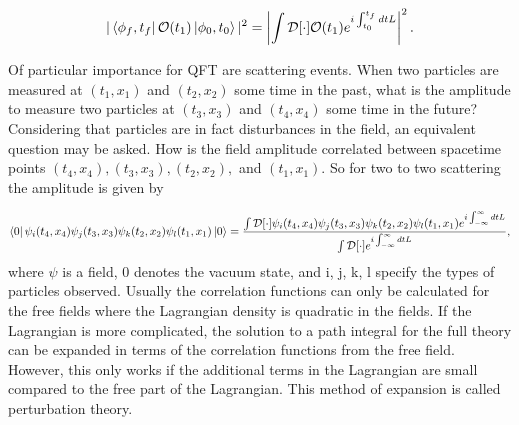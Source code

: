 \begin{equation}
|\bra{\phi_f,t_f}\mathcal{O}(t_1)\ket{\phi_0,t_0}|^2 = \left|\int \mathcal{D}[\cdot] \mathcal{O}(t_1) e^{i\int_{t_0}^{t_f} dt L}\right|^2.
\end{equation}

Of particular importance for QFT are scattering events. When two particles are measured at $(t_1,x_1)$ and $(t_2,x_2)$ some time in the past, what is the amplitude to measure two particles at $(t_3,x_3)$ and $(t_4,x_4)$ some time in the future? Considering that particles are in fact disturbances in the field, an equivalent question may be asked. How is the field amplitude correlated between spacetime points $(t_4, x_4), (t_3, x_3), (t_2, x_2),$ and $(t_1, x_1)$. So for two to two scattering the amplitude is given by

\begin{equation}
\bra{0}\psi_i(t_4,x_4)\psi_j(t_3,x_3)\psi_k(t_2,x_2)\psi_l(t_1,x_1)\ket{0} = 
\frac{\int \mathcal{D}[\cdot]\psi_i(t_4,x_4)\psi_j(t_3,x_3)\psi_k(t_2,x_2)\psi_l(t_1,x_1)
e^{i\int_{-\infty}^{\infty} dt L}}{\int \mathcal{D}[\cdot]e^{i\int_{-\infty}^{\infty} dt L}},
\end{equation}
where $\psi$ is a field, 0 denotes the vacuum state, and i, j, k, l specify the types of particles observed. Usually the correlation functions can only be calculated for the free fields where the Lagrangian density is quadratic in the fields. If the Lagrangian is more complicated, the solution to a path integral for the full theory can be expanded in terms of the correlation functions from the free field. However, this only works if the additional terms in the Lagrangian are small compared to the free part of the Lagrangian. This method of expansion is called perturbation theory.     


